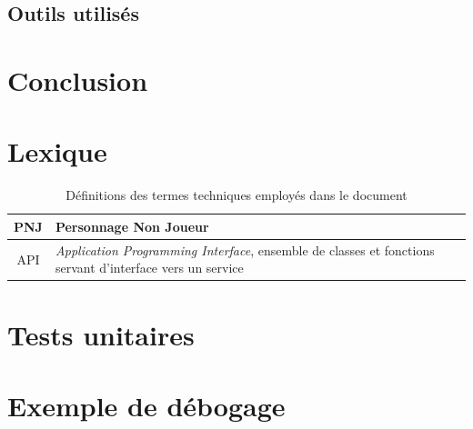 \documentclass[a4paper,12pt]{article}
\begin{document}
\subsection{Outils utilisés}



\section{Conclusion}



\newpage
\appendix

\section{Lexique}

\begin{table}[h]
    \centering
    \begin{tabular}{c p{}}
	\toprule
	PNJ		    & Personnage Non Joueur \\
	\midrule
	API \label{def_api} & \textit{Application Programming Interface}, ensemble de classes et fonctions servant d’interface vers un service \\
	\bottomrule
    \end{tabular}
    \caption{Définitions des termes techniques employés dans le document}
\end{table}



\section{Tests unitaires}
\section{Exemple de débogage}

\end{document}
